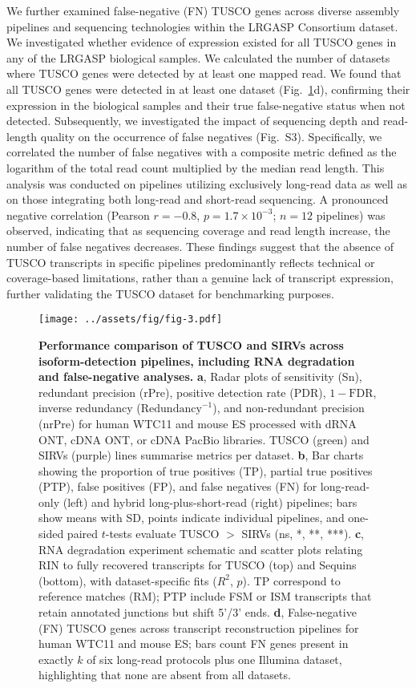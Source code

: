 \documentclass[pdflatex,sn-nature]{sn-jnl}%
\begin{document}
We further examined false-negative (FN) TUSCO genes across diverse assembly pipelines and sequencing technologies within the LRGASP Consortium dataset. We investigated whether evidence of expression existed for all TUSCO genes in any of the LRGASP biological samples. We calculated the number of datasets where TUSCO genes were detected by at least one mapped read. We found that all TUSCO genes were detected in at least one dataset (Fig.~\ref{fig:figure3}d), confirming their expression in the biological samples and their true false-negative status when not detected. Subsequently, we investigated the impact of sequencing depth and read-length quality on the occurrence of false negatives (Fig.~S3). Specifically, we correlated the number of false negatives with a composite metric defined as the logarithm of the total read count multiplied by the median read length. This analysis was conducted on pipelines utilizing exclusively long-read data as well as on those integrating both long-read and short-read sequencing. A pronounced negative correlation (Pearson $r = -0.8$, $p = 1.7 \times 10^{-3}$; $n = 12$ pipelines) was observed, indicating that as sequencing coverage and read length increase, the number of false negatives decreases. These findings suggest that the absence of TUSCO transcripts in specific pipelines predominantly reflects technical or coverage-based limitations, rather than a genuine lack of transcript expression, further validating the TUSCO dataset for benchmarking purposes.


\begin{figure}[p]
    \centering
    \texttt{[image: ../assets/fig/fig-3.pdf]}
    \caption{\textbf{Performance comparison of TUSCO and SIRVs across isoform-detection pipelines, including RNA degradation and false-negative analyses.} \textbf{a}, Radar plots of sensitivity (Sn), redundant precision (rPre), positive detection rate (PDR), $1 - \mathrm{FDR}$, inverse redundancy ($\mathrm{Redundancy}^{-1}$), and non-redundant precision (nrPre) for human WTC11 and mouse ES processed with dRNA ONT, cDNA ONT, or cDNA PacBio libraries. TUSCO (green) and SIRVs (purple) lines summarise metrics per dataset. \textbf{b}, Bar charts showing the proportion of true positives (TP), partial true positives (PTP), false positives (FP), and false negatives (FN) for long-read-only (left) and hybrid long-plus-short-read (right) pipelines; bars show means with SD, points indicate individual pipelines, and one-sided paired $t$-tests evaluate TUSCO $>$ SIRVs (ns, *, **, ***). \textbf{c}, RNA degradation experiment schematic and scatter plots relating RIN to fully recovered transcripts for TUSCO (top) and Sequins (bottom), with dataset-specific fits ($R^2$, $p$). TP correspond to reference matches (RM); PTP include FSM or ISM transcripts that retain annotated junctions but shift 5'/3' ends. \textbf{d}, False-negative (FN) TUSCO genes across transcript reconstruction pipelines for human WTC11 and mouse ES; bars count FN genes present in exactly $k$ of six long-read protocols plus one Illumina dataset, highlighting that none are absent from all datasets.}
    \label{fig:figure3}
\end{figure}
\end{document}
